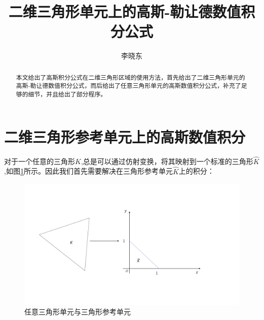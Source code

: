 \documentclass{article}                          %
\title{二维三角形单元上的高斯-勒让德数值积分公式}
\author[*]{李晓东}
\affil[*]{中国地质大学（武汉）工程学院,地球深部能源实验室}
\numberwithin{equation}{subsection}              %
\begin{document}
	\maketitle
	\begin{abstract}
		本文给出了高斯积分公式在二维三角形区域的使用方法，首先给出了二维三角形单元的高斯-勒让德数值积分公式，而后给出了任意三角形单元的高斯数值积分公式，补充了足够的细节，并且给出了部分程序。
	\end{abstract}
\section{二维三角形参考单元上的高斯数值积分}
对于一个任意的三角形$ K $,总是可以通过仿射变换，将其映射到一个标准的三角形$ \hat{K} $,如图\ref{fig01}所示。因此我们首先需要解决在三角形参考单元$ \hat{K} $上的积分：
	\begin{figure}
		\includegraphics[width=\linewidth]{fig_triangle.pdf}
		\caption{任意三角形单元与三角形参考单元}
		\label{fig01}
	\end{figure}
\end{document}
